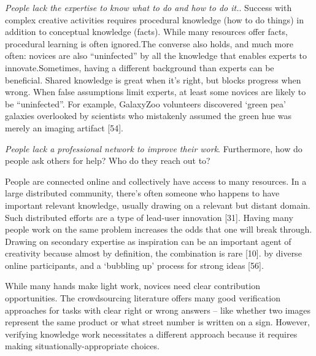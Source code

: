 \textit{People lack the expertise to know what to do and how to do it.}. 
Success with complex creative activities requires procedural
knowledge (how to do things) in addition to conceptual
knowledge (facts). While many resources offer facts, procedural
learning is often ignored.The converse also holds, and much more often: novices are also
“uninfected” by all the knowledge that enables experts to
innovate.Sometimes, having a different background than experts can
be beneficial. Shared knowledge is great when it’s right, but
blocks progress when wrong. When false assumptions limit
experts, at least some novices are likely to be “uninfected”.
For example, GalaxyZoo volunteers discovered ‘green pea’
galaxies overlooked by scientists who mistakenly assumed
the green hue was merely an imaging artifact [54]. 




\textit{People lack a professional network to improve their work}. 
Furthermore,  how do people ask others for help? Who do they reach out to?

People are connected online and collectively have access to many resources.
In a large distributed community, there’s often someone who happens to 
have important relevant knowledge, usually drawing on a relevant but 
distant domain. Such distributed efforts are a type of lead-user innovation [31]. 
Having many people work on the same problem increases the odds that 
one will break through. Drawing on secondary expertise as inspiration can
 be an important agent of creativity because almost by definition, the 
combination is rare [10]. %
 by diverse online participants, and a ‘bubbling up’ process for strong ideas [56].

While many hands make light work, novices need clear contribution opportunities. 
The crowdsourcing literature offers many good verification approaches for tasks 
with clear right or wrong answers – like whether two images represent the same 
product or what street number is written on a sign. However, verifying knowledge
 work necessitates a different approach because it requires making 
situationally-appropriate choices. 

